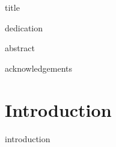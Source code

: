 \documentclass[a4paper,12pt,oneside]{book}
\begin{document}
\frontmatter

{title}

{dedication}
\normalsize

{abstract}

{acknowledgements}

\addbookmark{\contentsname}
\tableofcontents

\addcontent{\listfigurename}
\listoffigures

\addcontent{\listtablename}
\listoftables

\mainmatter

\chapter{Introduction}
{introduction}

\backmatter

\printbibliography[
    heading=bibintoc,
    title={Bibliography}]
\end{document}

